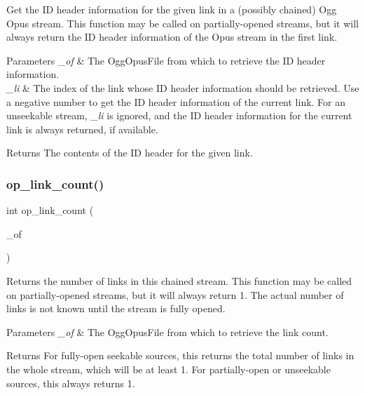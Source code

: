 Get the ID header information for the given link in a (possibly chained) Ogg Opus stream. This function may be called on partially-\/opened streams, but it will always return the ID header information of the Opus stream in the first link. 
\begin{DoxyParams}{Parameters}
{\em \+\_\+of} & The {\ttfamily Ogg\+Opus\+File} from which to retrieve the ID header information. \\
\hline
{\em \+\_\+li} & The index of the link whose ID header information should be retrieved. Use a negative number to get the ID header information of the current link. For an unseekable stream, {\itshape \+\_\+li} is ignored, and the ID header information for the current link is always returned, if available. \\
\hline
\end{DoxyParams}
\begin{DoxyReturn}{Returns}
The contents of the ID header for the given link. 
\end{DoxyReturn}
\mbox{\label{group__stream__info_gaaf6ff40725a8bc7e73c9d396ab91837d}} 
\subsubsection{\texorpdfstring{op\+\_\+link\+\_\+count()}{op\_link\_count()}}
{\footnotesize\ttfamily int op\+\_\+link\+\_\+count (\begin{DoxyParamCaption}\item[{\hyperlink{zconf_8h_a2c212835823e3c54a8ab6d95c652660e}{const} Ogg\+Opus\+File $\ast$}]{\+\_\+of }\end{DoxyParamCaption})}

Returns the number of links in this chained stream. This function may be called on partially-\/opened streams, but it will always return 1. The actual number of links is not known until the stream is fully opened. 
\begin{DoxyParams}{Parameters}
{\em \+\_\+of} & The {\ttfamily Ogg\+Opus\+File} from which to retrieve the link count. \\
\hline
\end{DoxyParams}
\begin{DoxyReturn}{Returns}
For fully-\/open seekable sources, this returns the total number of links in the whole stream, which will be at least 1. For partially-\/open or unseekable sources, this always returns 1. 
\end{DoxyReturn}
\mbox{\label{group__stream__info_gae07b8e40d883cd2a43edfec8c5bfa205}} 
